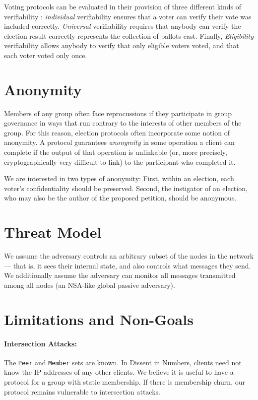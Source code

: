 Voting protocols can be evaluated in their provision of three different
kinds of verifiability \cite{kremer_election_2010}: \emph{individual}
verifiability ensures that a voter can verify their vote was included
correctly. \emph{Universal} verifiability requires that anybody can verify
the election result correctly represents the collection of ballots cast.
Finally, \emph{Eligibility} verifiability allows anybody to verify that
only eligible voters voted, and that each voter voted only once.

\section{Anonymity}
Members of any group often face reprocussions if they participate in group
governance in ways that run contrary to the interests of other members of
the group. For this reason, election protocols often incorporate some notion
of anonymity. A protocol guarantees \emph{anonymity} in some operation a
client can complete if the output of that operation is unlinkable (or, more
precisely, cryptographically very difficult to link) to the participant who
completed it\cite{ford_hiding_2014}.

We are interested in two types of anonymity: First, within an election,
each voter's confidentiality should be preserved. Second, the instigator of an
election, who may also be the author of the proposed petition, should be
anonymous.

\section{Threat Model}
We assume the adversary controls an arbitrary subset of the nodes in the network
--- that is, it sees their internal state, and also controls what messages they
send. We additionally assume the adversary can monitor all messages transmitted
among all nodes (an NSA-like global passive adversary).

\section{Limitations and Non-Goals}
  \paragraph{Intersection Attacks:} The \texttt{Peer} and \texttt{Member} sets
  are known. In Dissent in Numbers, clients need not know the IP addresses of
  any other clients. We believe it is useful to have a protocol for a group with
  static membership.  If there is membership churn, our protocol remains
  vulnerable to intersection attacks.
